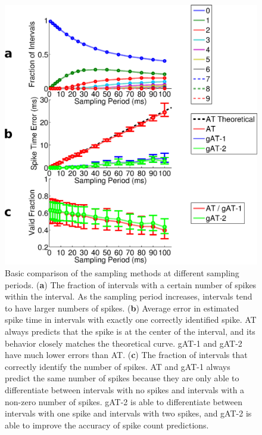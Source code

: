 \documentclass[10 pt]{article}
\begin{document}
\begin{figure}[htbp]
\begin{center}
\includegraphics[scale=0.35]{basic_comparison.eps}
\caption{Basic comparison of the sampling methods at different sampling periods. (\textbf{a}) The fraction of intervals with a certain number of spikes within the interval. As the sampling period increases, intervals tend to have larger numbers of spikes. (\textbf{b}) Average error in estimated spike time in intervals with exactly one correctly identified spike. AT always predicts that the spike is at the center of the interval, and its behavior closely matches the theoretical curve. gAT-1 and gAT-2 have much lower errors than AT. (\textbf{c}) The fraction of intervals that correctly identify the number of spikes. AT and gAT-1 always predict the same number of spikes because they are only able to differentiate between intervals with no spikes and intervals with a non-zero number of spikes. gAT-2 is able to differentiate between intervals with one spike and intervals with two spikes, and gAT-2 is able to improve the accuracy of spike count predictions.}
\label{fig:basic_comparison}
\end{center}
\end{figure}
\end{document}
